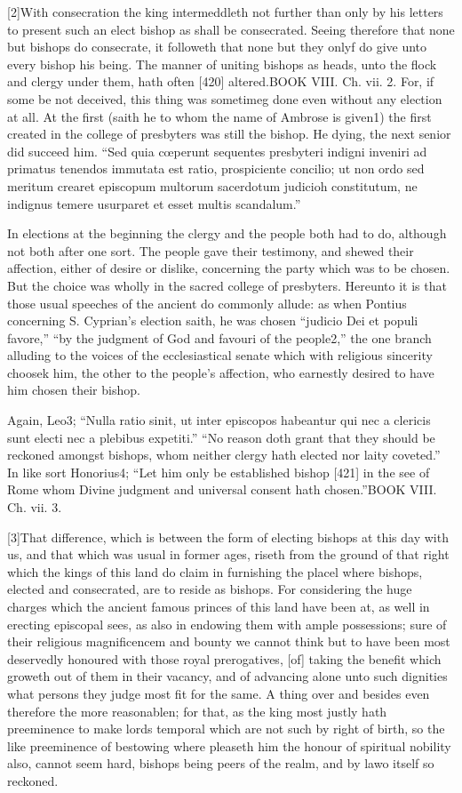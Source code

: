 [2]With consecration the king intermeddleth not further than only by his letters to present such an elect bishop as shall be consecrated. Seeing therefore that none but bishops do consecrate, it followeth that none but they onlyf do give unto every bishop his being. The manner of uniting bishops as heads, unto the flock and clergy under them, hath often [420] altered.BOOK VIII. Ch. vii. 2. For, if some be not deceived, this thing was sometimeg done even without any election at all. At the first (saith he to whom the name of Ambrose is given1) the first created in the college of presbyters was still the bishop. He dying, the next senior did succeed him. “Sed quia cœperunt sequentes presbyteri indigni inveniri ad primatus tenendos immutata est ratio, prospiciente concilio; ut non ordo sed meritum crearet episcopum multorum sacerdotum judicioh constitutum, ne indignus temere usurparet et esset multis scandalum.”

In elections at the beginning the clergy and the people both had to do, although not both after one sort. The people gave their testimony, and shewed their affection, either of desire or dislike, concerning the party which was to be chosen. But the choice was wholly in the sacred college of presbyters. Hereunto it is that those usual speeches of the ancient do commonly allude: as when Pontius concerning S. Cyprian’s election saith, he was chosen “judicio Dei et populi favore,” “by the judgment of God and favouri of the people2,” the one branch alluding to the voices of the ecclesiastical senate which with religious sincerity choosek him, the other to the people’s affection, who earnestly desired to have him chosen their bishop.

Again, Leo3; “Nulla ratio sinit, ut inter episcopos habeantur qui nec a clericis sunt electi nec a plebibus expetiti.” “No reason doth grant that they should be reckoned amongst bishops, whom neither clergy hath elected nor laity coveted.” In like sort Honorius4; “Let him only be established bishop [421] in the see of Rome whom Divine judgment and universal consent hath chosen.”BOOK VIII. Ch. vii. 3.

[3]That difference, which is between the form of electing bishops at this day with us, and that which was usual in former ages, riseth from the ground of that right which the kings of this land do claim in furnishing the placel where bishops, elected and consecrated, are to reside as bishops. For considering the huge charges which the ancient famous princes of this land have been at, as well in erecting episcopal sees, as also in endowing them with ample possessions; sure of their religious magnificencem and bounty we cannot think but to have been most deservedly honoured with those royal prerogatives, [of] taking the benefit which groweth out of them in their vacancy, and of advancing alone unto such dignities what persons they judge most fit for the same. A thing over and besides even therefore the more reasonablen; for that, as the king most justly hath preeminence to make lords temporal which are not such by right of birth, so the like preeminence of bestowing where pleaseth him the honour of spiritual nobility also, cannot seem hard, bishops being peers of the realm, and by lawo itself so reckoned.

